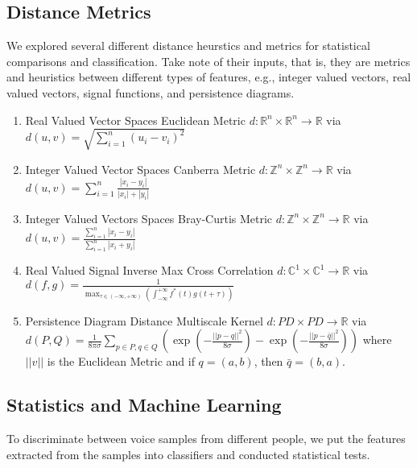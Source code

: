 \documentclass[12pt]{article}
\begin{document}
\subsection{Distance Metrics}
\-\hspace{1cm} We explored several different distance heurstics and metrics for
statistical comparisons and classification. Take note of their inputs, that is,
they are metrics and heuristics between different types of features, e.g.,
integer valued vectors, real valued vectors, signal functions, and persistence
diagrams.
\begin{enumerate}
  \item Real Valued Vector Spaces Euclidean Metric \newline $d : \mathbb{R}^n
  \times \mathbb{R}^n \rightarrow \mathbb{R}$ via $d(u,v) = \sqrt{\sum_{i=1}^{n}(u_i - v_i)^2}$
  \item Integer Valued Vector Spaces Canberra Metric \newline $d : \mathbb{Z}^n
  \times \mathbb{Z}^n \rightarrow \mathbb{R}$ via $d(u,v) = \sum_{i = 1}^{n} \frac{|x_i -
  y_i|}{|x_i| + |y_i|}$
  \item Integer Valued Vectors Spaces Bray-Curtis Metric \newline $d :
  \mathbb{Z}^n \times \mathbb{Z}^n \rightarrow \mathbb{R}$ via $d(u,v) = \frac{\sum_{i = 1}^{n}|x_i
  - y_i|}{\sum_{i = 1}^{n}|x_i + y_i|}$
  \item Real Valued Signal Inverse Max Cross Correlation \newline $d :
  \mathbb{C}^1 \times \mathbb{C}^1 \rightarrow \mathbb{R}$ via $d(f,g) =
  \frac{1}{\max _{\tau \in (-\infty,+\infty)} (\int _{-\infty}^{+\infty}
  f^{*}(t)g(t+\tau))}$
  \item Persistence Diagram Distance Multiscale Kernel \newline $d : PD \times
  PD \rightarrow \mathbb{R}$ via $d(P,Q) = \frac{1}{8 \pi \sigma} \sum_{p \in
  P, q \in Q}(\exp(-\frac{||p-q||^2}{8 \sigma}) -
  \exp(-\frac{||p-\bar{q}||^2}{8 \sigma}))$ where $||v||$ is the Euclidean
  Metric and if $q = (a,b)$, then $\bar{q} = (b,a)$. 
\end{enumerate}

\subsection{Statistics and Machine Learning}
\-\hspace{1cm} To discriminate between voice samples from different people, we
put the features extracted from the samples into classifiers and conducted
statistical tests.
\end{document}
